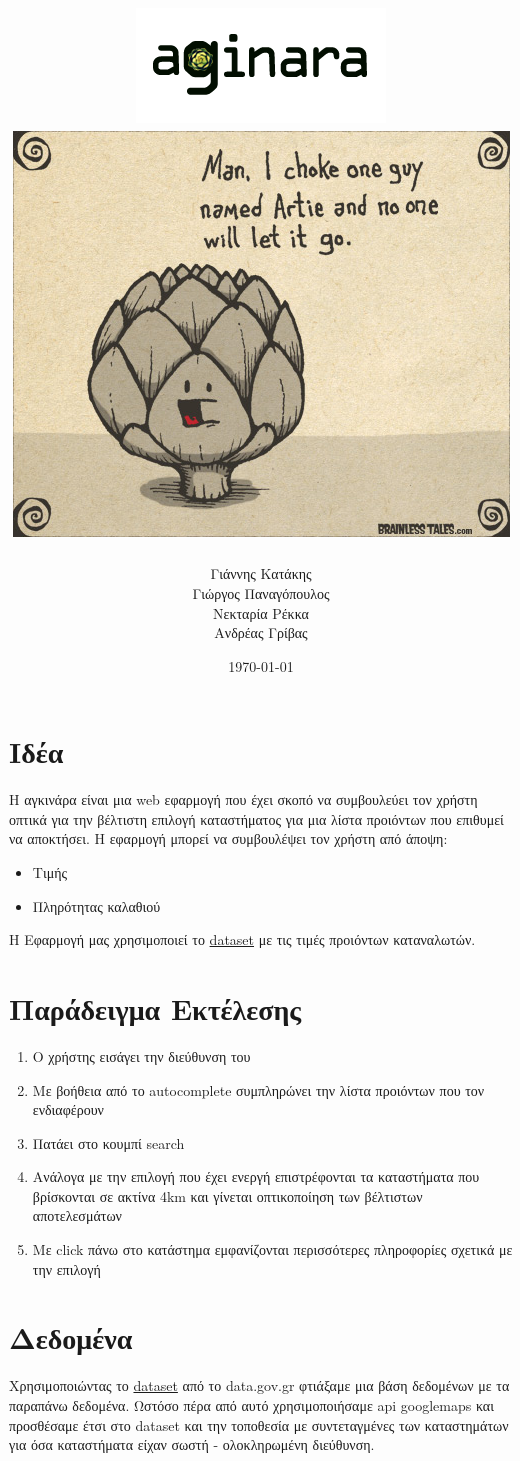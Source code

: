 \documentclass[a4paper,10pt]{report}
\title{
\vspace{-1cm}
\centering
\includegraphics[scale=0.8]{aginara-logo3.png}
\vspace{1cm}
\includegraphics[scale=0.6]{artichoke.jpg}
\vspace{0.5cm}
}
\author{Γιάννης Κατάκης \\Γιώργος Παναγόπουλος\\ Νεκταρία Ρέκκα\\Ανδρέας Γρίβας}
\date{\today}
\begin{document}
\maketitle
\tableofcontents

\newpage
\section{Ιδέα}
Η αγκινάρα είναι μια web εφαρμογή που έχει σκοπό να συμβουλεύει τον χρήστη οπτικά για την 
βέλτιστη επιλογή καταστήματος για μια λίστα
προιόντων που επιθυμεί να αποκτήσει. Η εφαρμογή μπορεί να συμβουλέψει τον χρήστη από άποψη: 
\begin{itemize}
 \item Τιμής
 \item Πληρότητας καλαθιού
\end{itemize}
Η Εφαρμογή μας χρησιμοποιεί το \href{http://www.data.gov.gr/dataset/17/}{dataset} με τις τιμές 
προιόντων καταναλωτών.\\

\section{Παράδειγμα Εκτέλεσης}

\begin{enumerate}
 \item Ο χρήστης εισάγει την διεύθυνση του
 \item Με βοήθεια από το autocomplete συμπληρώνει την λίστα προιόντων που τον ενδιαφέρουν
 \item Πατάει στο κουμπί search
 \item Ανάλογα με την επιλογή που έχει ενεργή επιστρέφονται τα καταστήματα που βρίσκονται σε ακτίνα
 4km και γίνεται οπτικοποίηση των βέλτιστων αποτελεσμάτων
 \item Με click πάνω στο κατάστημα εμφανίζονται περισσότερες πληροφορίες σχετικά με την επιλογή
\end{enumerate}

\section{Δεδομένα}
Χρησιμοποιώντας το \href{http://www.data.gov.gr/dataset/17/}{dataset} από το data.gov.gr 
φτιάξαμε μια βάση δεδομένων με τα παραπάνω δεδομένα. Ωστόσο πέρα από αυτό χρησιμοποιήσαμε
api googlemaps και προσθέσαμε έτσι στο dataset και την τοποθεσία με συντεταγμένες των 
καταστημάτων για όσα καταστήματα είχαν σωστή - ολοκληρωμένη διεύθυνση. 
\end{document}
